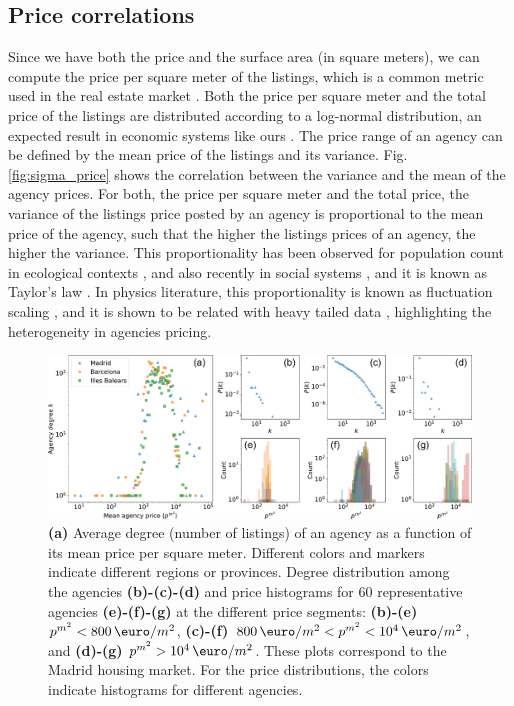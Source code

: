 \subsection{Price correlations}

Since we have both the price and the surface area (in square meters), we can compute the price per square meter of the listings, which is a common metric used in the real estate market \cite{}. Both the price per square meter and the total price of the listings are distributed according to a log-normal distribution, an expected result in economic systems like ours \cite{}. The price range of an agency can be defined by the mean price of the listings and its variance. Fig. \ref{fig:sigma_price} shows the correlation between the variance and the mean of the agency prices. For both, the price per square meter and the total price, the variance of the listings price posted by an agency is proportional to the mean price of the agency, such that the higher the listings prices of an agency, the higher the variance. This proportionality has been observed for population count in ecological contexts \cite{Violeta cites}, and also recently in social systems \cite{Violeta citation}, and it is known as Taylor's law \cite{}. In physics literature, this proportionality is known as fluctuation scaling \cite{}, and it is shown to be related with heavy tailed data \cite{PNAS_Brown_2021}, highlighting the heterogeneity in agencies pricing.

\begin{figure}
    \centering
    \includegraphics[width =\textwidth]{Figs/Idealista_dynamics/panel_price.pdf}
	\caption[Price segmentation by the degree.]{\textbf{(a)} Average degree (number of listings) of an agency as a function of its mean price per square meter. Different colors and markers indicate different regions or provinces. Degree distribution among the agencies \textbf{(b)-(c)-(d)} and price histograms for 60 representative agencies \textbf{(e)-(f)-(g)} at the different price segments: \textbf{(b)-(e)} $p^{{m}^2} < 800 \, \textup{\euro} / m^2$, \textbf{(c)-(f)} $800 \, \textup{\euro}  / m^2 < p^{{m}^2} < 10^4 \, \textup{\euro}  / m^2$, and \textbf{(d)-(g)} $p^{{m}^2} > 10^4 \, \textup{\euro}  / m^2$. These plots correspond to the Madrid housing market. For the price distributions, the colors indicate histograms for different agencies. \label{fig:panel_price}}
\end{figure}

